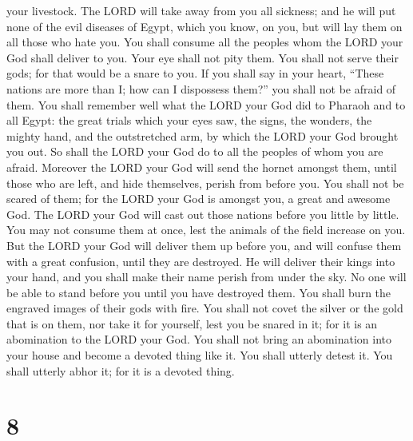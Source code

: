your livestock.  The LORD will take away from you all
sickness; and he will put none of the evil diseases of Egypt, which you
know, on you, but will lay them on all those who hate you. 
You shall consume all the peoples whom the LORD your God shall deliver
to you. Your eye shall not pity them. You shall not serve their gods;
for that would be a snare to you.  If you shall say in your
heart, ``These nations are more than I; how can I dispossess them?''
 you shall not be afraid of them. You shall remember well
what the LORD your God did to Pharaoh and to all Egypt: 
the great trials which your eyes saw, the signs, the wonders, the mighty
hand, and the outstretched arm, by which the LORD your God brought you
out. So shall the LORD your God do to all the peoples of whom you are
afraid.  Moreover the LORD your God will send the hornet
amongst them, until those who are left, and hide themselves, perish from
before you.  You shall not be scared of them; for the LORD
your God is amongst you, a great and awesome God.  The LORD
your God will cast out those nations before you little by little. You
may not consume them at once, lest the animals of the field increase on
you.  But the LORD your God will deliver them up before
you, and will confuse them with a great confusion, until they are
destroyed.  He will deliver their kings into your hand, and
you shall make their name perish from under the sky. No one will be able
to stand before you until you have destroyed them.  You
shall burn the engraved images of their gods with fire. You shall not
covet the silver or the gold that is on them, nor take it for yourself,
lest you be snared in it; for it is an abomination to the LORD your God.
 You shall not bring an abomination into your house and
become a devoted thing like it. You shall utterly detest it. You shall
utterly abhor it; for it is a devoted thing.

\hypertarget{section-7}{%
\section{8}\label{section-7}}

